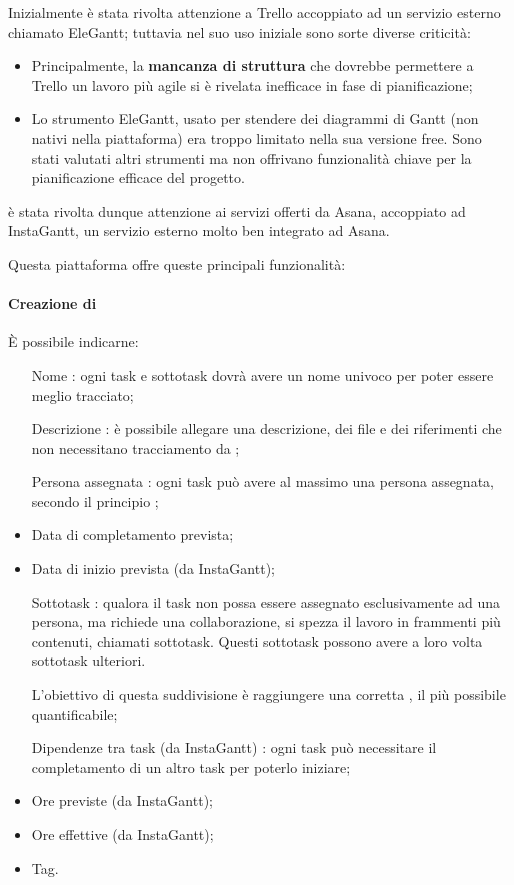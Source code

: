 Inizialmente è stata rivolta attenzione a Trello accoppiato ad un servizio esterno chiamato EleGantt; tuttavia nel suo uso iniziale sono sorte diverse criticità:

\begin{itemize}
\item Principalmente, la \textbf{mancanza di struttura} che dovrebbe permettere a Trello un lavoro più agile si è rivelata inefficace in fase di pianificazione;
\item Lo strumento EleGantt, usato per stendere dei diagrammi di Gantt (non nativi nella piattaforma) era troppo limitato nella sua versione free. Sono stati valutati altri strumenti ma non offrivano funzionalità chiave per la pianificazione efficace del progetto.
\end{itemize}

è stata rivolta dunque attenzione ai servizi offerti da Asana, accoppiato ad InstaGantt, un servizio esterno molto ben integrato ad Asana.

Questa piattaforma offre queste principali funzionalità:
\paragraph{Creazione di } 
È possibile indicarne:
\begin{itemize}
\item [Nome]: ogni task e sottotask dovrà avere un nome univoco per poter essere meglio tracciato;
\item [Descrizione]: è possibile allegare una descrizione, dei file e dei riferimenti che non necessitano tracciamento da ;
\item [Persona assegnata]: ogni task può avere al massimo una persona assegnata, secondo il principio ;
\item Data di completamento prevista;
\item Data di inizio prevista (da InstaGantt);
\item [Sottotask]: qualora il task non possa essere assegnato esclusivamente ad una persona, ma richiede una collaborazione, si spezza il lavoro in frammenti più contenuti, chiamati sottotask. Questi sottotask possono avere a loro volta sottotask ulteriori.

L'obiettivo di questa suddivisione è raggiungere una corretta , il più possibile quantificabile;
\item [Dipendenze tra task (da InstaGantt)]: ogni task può necessitare il completamento di un altro task per poterlo iniziare;
\item Ore previste (da InstaGantt);
\item Ore effettive (da InstaGantt);
\item Tag.
\end{itemize}

